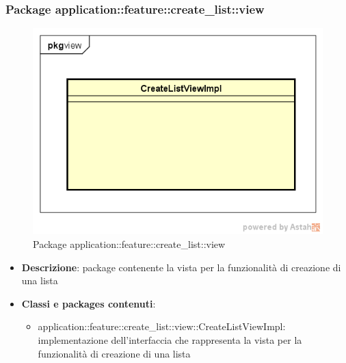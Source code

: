 \subsubsection{Package application::feature::create\_list::view}
\label{Package application::feature::create_list::view}
\begin{figure}[H]
	\centering
	\includegraphics[scale=0.5]{Sezioni/Packages/Application/create_list_view.png}
	\caption{Package application::feature::create\_list::view}
\end{figure}
\begin{itemize}
	\item \textbf{Descrizione}: package contenente la vista per la funzionalità di creazione di una lista
	\item \textbf{Classi e packages contenuti}:
	\begin{itemize}
	\item application::feature::create\_list::view::CreateListViewImpl: implementazione dell'interfaccia che rappresenta la vista per la funzionalità di creazione di una lista
	\end{itemize}
\end{itemize}

